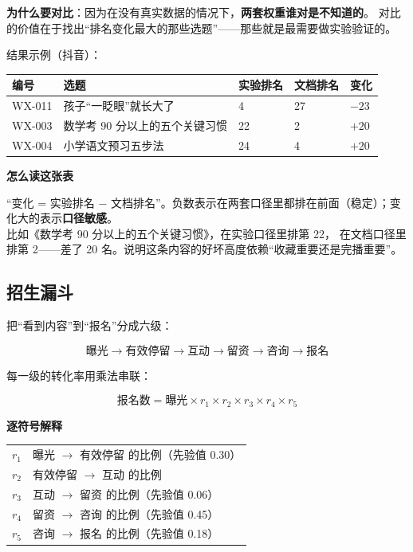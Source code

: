 \documentclass[UTF8,a4paper,11pt]{ctexart}
\newenvironment{explainbox}[1]
{\begin{center}\begin{minipage}{0.94\textwidth}\colorbox{boxbg}{\parbox{0.92\textwidth}{\textbf{#1}\par\vspace{2pt}}}}
{\end{minipage}\end{center}}
\newcommand{\hl}[1]{\textcolor{blue!70!black}{\textbf{#1}}}
\begin{document}
\textbf{为什么要对比}：因为在没有真实数据的情况下，\hl{两套权重谁对是不知道的}。
对比的价值在于找出“排名变化最大的那些选题”——那些就是最需要做实验验证的。

结果示例（抖音）：

\begin{center}
\begin{tabular}{p{1.6cm}p{5.2cm}p{2.0cm}p{2.0cm}p{1.8cm}}
\toprule
\textbf{编号} & \textbf{选题} & \textbf{实验排名} & \textbf{文档排名} & \textbf{变化} \\
\midrule
WX-011 & 孩子“一眨眼”就长大了 & 4 & 27 & $-23$ \\
WX-003 & 数学考 90 分以上的五个关键习惯 & 22 & 2 & $+20$ \\
WX-004 & 小学语文预习五步法 & 24 & 4 & $+20$ \\
\bottomrule
\end{tabular}
\end{center}

\begin{explainbox}{怎么读这张表}
“变化 = 实验排名 $-$ 文档排名”。负数表示在两套口径里都排在前面（稳定）；变化大的表示\hl{口径敏感}。\\
比如《数学考 90 分以上的五个关键习惯》，在实验口径里排第 22，
在文档口径里排第 2——差了 20 名。说明这条内容的好坏高度依赖“收藏重要还是完播重要”。
\end{explainbox}

\subsection{招生漏斗}

把“看到内容”到“报名”分成六级：

\begin{equation}
\text{曝光} \to \text{有效停留} \to \text{互动} \to \text{留资} \to \text{咨询} \to \text{报名}
\end{equation}

每一级的转化率用乘法串联：

\begin{equation}
\text{报名数} = \text{曝光} \times r_1 \times r_2 \times r_3 \times r_4 \times r_5
\end{equation}

\begin{explainbox}{逐符号解释}
\begin{longtable}{@{}p{2.4cm}p{11.4cm}@{}}
$r_1$ & 曝光 $\to$ 有效停留 的比例（先验值 0.30） \\
$r_2$ & 有效停留 $\to$ 互动 的比例 \\
$r_3$ & 互动 $\to$ 留资 的比例（先验值 0.06） \\
$r_4$ & 留资 $\to$ 咨询 的比例（先验值 0.45） \\
$r_5$ & 咨询 $\to$ 报名 的比例（先验值 0.18） \\
\end{longtable}
\end{explainbox}
\end{document}
